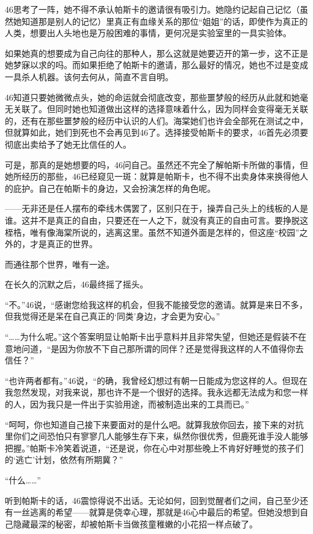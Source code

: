 46思考了一阵，她不得不承认帕斯卡的邀请很有吸引力。她隐约记起自己记忆（虽然她知道那是别人的记忆）里真正有血缘关系的那位“姐姐”的话，即使作为真正的人类，想要出人头地也是万般困难的事情，更何况是实验室里的一具实验体。

如果她真的想要成为自己向往的那种人，那么这就是她要迈开的第一步，这不正是她梦寐以求的吗。而如果拒绝了帕斯卡的邀请，那么最好的情况，她也不过是变成一具杀人机器。该何去何从，简直不言自明。

46知道只要她微微点头，她的命运就会彻底改变，那些噩梦般的经历从此就和她毫无关联了。但同时她也知道做出这样的选择意味着什么，因为同样会变得毫无关联的，还有在那些噩梦般的经历中认识的人们。海棠她们也许会全部死在测试之中，但就算如此，她们到死也不会再见到46了。选择接受帕斯卡的要求，46首先必须要彻底出卖给予了她无比信任的人。

可是，那真的是她想要的吗，46问自己。虽然还不完全了解帕斯卡所做的事情，但她所经历的那些，46已经窥见一斑：就算是帕斯卡，也不得不出卖身体来换得他人的庇护。自己在帕斯卡的身边，又会扮演怎样的角色呢。

——无非还是任人摆布的牵线木偶罢了，区别只在于，操弄自己头上的线板的人是谁。这并不是真正的自由，只要还在一人之下，就没有真正的自由可言。要挣脱这桎梏，唯有像海棠所说的，逃离这里。虽然不知道外面是怎样的，但这座“校园”之外的，才是真正的世界。

而通往那个世界，唯有一途。

在长久的沉默之后，46最终摇了摇头。

“不。”46说，“感谢您给我这样的机会，但我不能接受您的邀请。就算是来日不多，但我觉得还是呆在自己真正的‘同类’身边，才会更为安心。”

“……为什么呢。”这个答案明显让帕斯卡出乎意料并且非常失望，但她还是假装不在意地问道，“是因为你放不下自己那所谓的同伴？还是觉得我这样的人不值得你去信任？”

“也许两者都有。”46说，“的确，我曾经幻想过有朝一日能成为您这样的人。但现在我忽然发现，对我来说，那也许不是一个很好的选择。我永远都无法成为和您一样的人，因为我只是一件出于实验用途，而被制造出来的工具而已。”

“呵呵，你也知道自己接下来要面对的是什么吧。就算我放你回去，接下来的对抗里你们之间恐怕只有寥寥几人能够生存下来，纵然你很优秀，但鹿死谁手没人能够把握。”帕斯卡冷笑着说道，“还是说，你在心中对那些晚上不肯好好睡觉的孩子们的‘逃亡’计划，依然有所期冀？”

“什么……”

听到帕斯卡的话，46震惊得说不出话。无论如何，回到觉醒者们之间，自己至少还有一丝逃离的希望——就算是侥幸心理，那就是46心中最后的希望。但她没想到自己隐藏最深的秘密，却被帕斯卡当做孩童稚嫩的小花招一样点破了。


